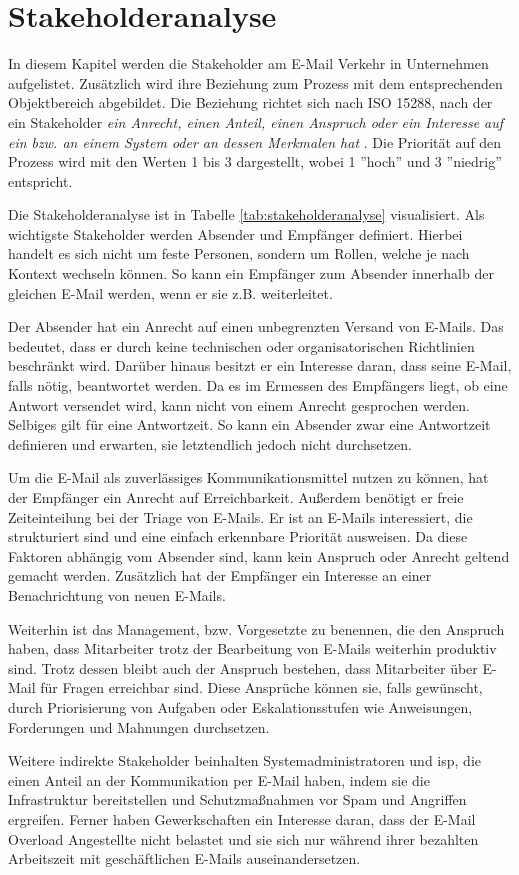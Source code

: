 
\chapter{Stakeholderanalyse}
\label{Stakeholderanalyse}

In diesem Kapitel werden die Stakeholder am E-Mail Verkehr in Unternehmen aufgelistet. Zusätzlich wird ihre Beziehung zum Prozess mit dem entsprechenden Objektbereich abgebildet. Die Beziehung richtet sich nach ISO 15288, nach der ein Stakeholder \emph{\glqq ein Anrecht, einen Anteil, einen Anspruch oder ein Interesse auf ein bzw. an einem System oder an dessen Merkmalen hat\grqq} \citep{ISO2015}. Die Priorität auf den Prozess wird mit den Werten 1 bis 3 dargestellt, wobei 1 ''hoch'' und 3 ''niedrig'' entspricht.

Die Stakeholderanalyse ist in Tabelle \ref{tab:stakeholderanalyse} visualisiert. Als wichtigste Stakeholder werden Absender und Empfänger definiert. Hierbei handelt es sich nicht um feste Personen, sondern um Rollen, welche je nach Kontext wechseln können. So kann ein Empfänger zum Absender innerhalb der gleichen E-Mail werden, wenn er sie z.B. weiterleitet.

Der Absender hat ein Anrecht auf einen unbegrenzten Versand von E-Mails. Das bedeutet, dass er durch keine technischen oder organisatorischen Richtlinien beschränkt wird. Darüber hinaus besitzt er ein Interesse daran, dass seine E-Mail, falls nötig, beantwortet werden. Da es im Ermessen des Empfängers liegt, ob eine Antwort versendet wird, kann nicht von einem Anrecht gesprochen werden. Selbiges gilt für eine Antwortzeit. So kann ein Absender zwar eine Antwortzeit definieren und erwarten, sie letztendlich jedoch nicht durchsetzen.

Um die E-Mail als zuverlässiges Kommunikationsmittel nutzen zu können, hat der Empfänger ein Anrecht auf Erreichbarkeit. Außerdem benötigt er freie Zeiteinteilung bei der Triage von E-Mails. Er ist an E-Mails interessiert, die strukturiert sind und eine einfach erkennbare Priorität ausweisen. Da diese Faktoren abhängig vom Absender sind, kann kein Anspruch oder Anrecht geltend gemacht werden. Zusätzlich hat der Empfänger ein Interesse an einer Benachrichtung von neuen E-Mails.

Weiterhin ist das Management, bzw. Vorgesetzte zu benennen, die den Anspruch haben, dass Mitarbeiter trotz der Bearbeitung von E-Mails weiterhin produktiv sind. Trotz dessen bleibt auch der Anspruch bestehen, dass Mitarbeiter über E-Mail für Fragen erreichbar sind. Diese Ansprüche können sie, falls gewünscht, durch Priorisierung von Aufgaben oder Eskalationsstufen wie Anweisungen, Forderungen und Mahnungen durchsetzen.

Weitere indirekte Stakeholder beinhalten Systemadministratoren und \acrfull{isp}, die einen Anteil an der Kommunikation per E-Mail haben, indem sie die Infrastruktur bereitstellen und Schutzmaßnahmen vor Spam und Angriffen ergreifen. Ferner haben Gewerkschaften ein Interesse daran, dass der E-Mail Overload Angestellte nicht belastet und sie sich nur während ihrer bezahlten Arbeitszeit mit geschäftlichen E-Mails auseinandersetzen.   
